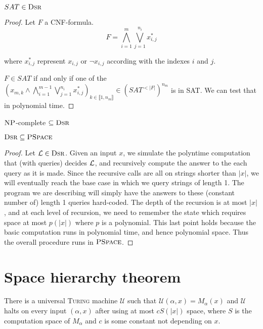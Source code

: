 \begin{propo}
    $SAT \in \textsc{Dsr}$
\end{propo}
\begin{proof}
    Let $F$ a CNF-formula.
    $$
        F=\bigwedge\limits_{i=1}^m \bigvee\limits_{j=1}^{n_i} x_{i,j}^*
    $$
    
    where $x_{i,j}^*$ represent $x_{i,j}$ or $\neg x_{i,j}$ according with the indexes $i$ and $j$.
    
    $F \in SAT$ if and only if one of the $\left(x_{m,k} \wedge \bigwedge\limits_{i=1}^{m-1} \bigvee\limits_{j=1}^{n_i} x_{i,j}^* \right)_{k\in\llbracket 1,n_m\rrbracket} \in \left(SAT^{<\vert F \vert}\right)^{n_m    }$ is in SAT. We can test that in polynomial time.
\end{proof}
\begin{corol}
    $\textsc{NP}$-complete $\subseteq \textsc{Dsr}$
\end{corol}

\begin{propo}
    $\textsc{Dsr} \subseteq \textsc{PSpace}$
\end{propo}
\begin{proof}
    Let $\mathcal{L} \in \textsc{Dsr}$. Given an input $x$, we simulate the polyntime computation that (with queries) decides $\mathcal{L}$, and recursively compute the answer to the each query as it is made. Since the recursive calls are all on strings shorter than $\vert x \vert$, we will eventually reach the base case in which we query strings of length 1. The program we are describing will simply have the answers to these (constant number of) length 1 queries hard-coded. The depth of the recursion is at most $\vert x \vert$, and at each level of recursion, we need to remember the state which requires space at most $p(\vert x\vert)$ where $p$ is a polynomial. This last point holds because the basic computation runs in polynomial time, and hence polynomial space. Thus the overall procedure runs in $\textsc{PSpace}$.
\end{proof}

\section{Space hierarchy theorem}

\begin{thm}\label{6:1}
    There is a universal \textsc{Turing} machine $\mathcal{U}$ such that $\mathcal{U}(\alpha,x) = M_\alpha(x)$ and $\mathcal{U}$ halts on every input $(\alpha,x)$ after using at most $c S(|x|)$ space, where $S$ is the computation space of $M_\alpha$ and $c$ is some constant not depending on $x$.
\end{thm}

